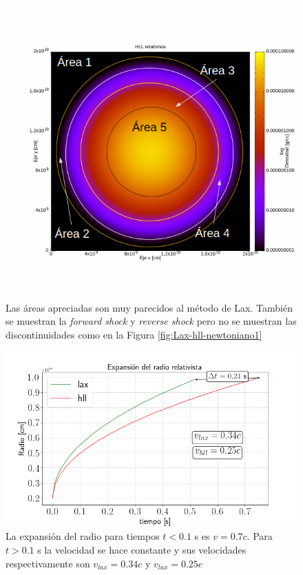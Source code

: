 \documentclass[12pt,a4paper]{book}
\begin{document}
\begin{figure}
\centering
\includegraphics[scale=0.5]{./Figuras/Pruebas/Prueba_onda_choque/Lax-HLL-rel/bwhll-rel65-analisis}
\caption{\label{fig:analisis_onda_relativista_hll1}Las áreas apreciadas son muy parecidos al método de Lax. También se muestran la \emph{forward shock} y \emph{reverse shock} pero no se muestran las discontinuidades como en la Figura \ref{fig:Lax-hll-newtoniano1}}
\end{figure}


\begin{figure}
\centering
\includegraphics[scale=0.5]{./Figuras/Pruebas/expansion_radial/Expansion_radio_relativista}
\caption{\label{fig:expansion_radio_relativista} La expansión del radio para tiempos $t < 0.1$ s es $v = 0.7c$. Para $t>0.1$ s la velocidad se hace constante y sus velocidades respectivamente son $v_{lax} = 0.34c$ y $v_{lax} = 0.25c$}
\end{figure}
\end{document}
